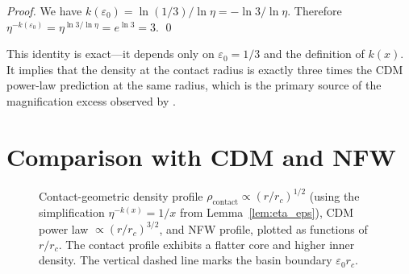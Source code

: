 \documentclass[11pt,a4paper,openright]{book}
\theoremstyle{dm3thm}
\theoremstyle{dm3def}
\newcommand{\eps}{\varepsilon_0}
\newcommand{\rhocon}{\rho_{\mathrm{contact}}}
\newcommand{\rc}{r_c}
\newcommand{\etaT}{\eta}   %
\begin{document}
\begin{proof}
We have $k(\eps) = \ln(1/3)/\ln\etaT = -\ln 3/\ln\etaT$.
Therefore
$\etaT^{-k(\eps)} = \etaT^{\ln 3/\ln\etaT} = e^{\ln 3} = 3$. \qed
\end{proof}

This identity is exact---it depends only on $\eps = 1/3$ and the definition of
$k(x)$.  It implies that the density at the contact radius is exactly three
times the CDM power-law prediction at the same radius, which is the primary
source of the magnification excess observed by \citet{NatarajanChiangDutra2026}.

\section{Comparison with CDM and NFW}

\begin{figure}[htbp]
\centering
{}
\caption{Contact-geometric density profile $\rhocon\propto(r/\rc)^{1/2}$ (using the
  simplification $\etaT^{-k(x)}=1/x$ from Lemma~\ref{lem:eta_eps}), CDM
  power law $\propto(r/\rc)^{3/2}$, and NFW profile, plotted as functions
  of $r/\rc$.  The contact profile exhibits a flatter core and higher inner
  density.  The vertical dashed line marks the basin boundary $\eps\rc$.}
\label{fig:density}
\end{figure}
\end{document}
